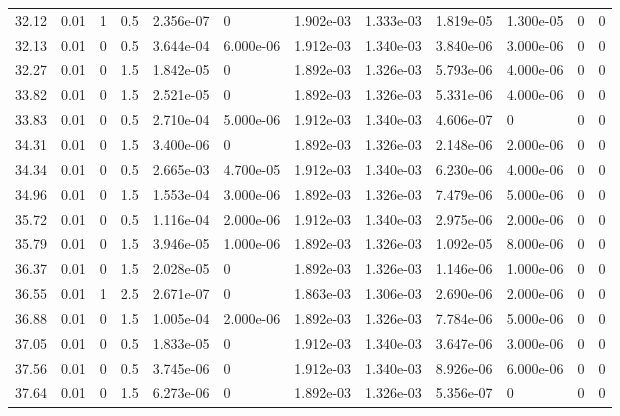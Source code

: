 \documentclass[preview]{standalone}
\begin{document}
{{{\begin{tabular}{L{1.2cm}C{1.2cm} C{0.3cm}C{0.5cm} C{1.4cm}C{1.4cm} C{1.4cm}C{1.4cm} C{1.6cm}C{1.6cm} C{1.6cm}C{1.6cm}}
  32.12  &  0.01  & 1     & 0.5 &  2.356e-07  & 0  &  1.902e-03&   1.333e-03& 1.819e-05 & 1.300e-05   &  0 & 0  \\ 
  32.13  &  0.01  & 0     & 0.5 &  3.644e-04  & 6.000e-06  &  1.912e-03&   1.340e-03& 3.840e-06 & 3.000e-06   &  0 & 0  \\ 
  32.27  &  0.01  & 0     & 1.5 &  1.842e-05  & 0  &  1.892e-03&   1.326e-03& 5.793e-06 & 4.000e-06   &  0 & 0  \\ 
  33.82  &  0.01  & 0     & 1.5 &  2.521e-05  & 0  &  1.892e-03&   1.326e-03& 5.331e-06 & 4.000e-06   &  0 & 0  \\ 
  33.83  &  0.01  & 0     & 0.5 &  2.710e-04  & 5.000e-06  &  1.912e-03&   1.340e-03& 4.606e-07 & 0   &  0 & 0  \\ 
  34.31  &  0.01  & 0     & 1.5 &  3.400e-06  & 0  &  1.892e-03&   1.326e-03& 2.148e-06 & 2.000e-06   &  0 & 0  \\ 
  34.34  &  0.01  & 0     & 0.5 &  2.665e-03  & 4.700e-05  &  1.912e-03&   1.340e-03& 6.230e-06 & 4.000e-06   &  0 & 0  \\ 
  34.96  &  0.01  & 0     & 1.5 &  1.553e-04  & 3.000e-06  &  1.892e-03&   1.326e-03& 7.479e-06 & 5.000e-06   &  0 & 0  \\ 
  35.72  &  0.01  & 0     & 0.5 &  1.116e-04  & 2.000e-06  &  1.912e-03&   1.340e-03& 2.975e-06 & 2.000e-06   &  0 & 0  \\ 
  35.79  &  0.01  & 0     & 1.5 &  3.946e-05  & 1.000e-06  &  1.892e-03&   1.326e-03& 1.092e-05 & 8.000e-06   &  0 & 0  \\ 
  36.37  &  0.01  & 0     & 1.5 &  2.028e-05  & 0  &  1.892e-03&   1.326e-03& 1.146e-06 & 1.000e-06   &  0 & 0  \\ 
  36.55  &  0.01  & 1     & 2.5 &  2.671e-07  & 0  &  1.863e-03&   1.306e-03& 2.690e-06 & 2.000e-06   &  0 & 0  \\ 
  36.88  &  0.01  & 0     & 1.5 &  1.005e-04  & 2.000e-06  &  1.892e-03&   1.326e-03& 7.784e-06 & 5.000e-06   &  0 & 0  \\ 
  37.05  &  0.01  & 0     & 0.5 &  1.833e-05  & 0  &  1.912e-03&   1.340e-03& 3.647e-06 & 3.000e-06   &  0 & 0  \\ 
  37.56  &  0.01  & 0     & 0.5 &  3.745e-06  & 0  &  1.912e-03&   1.340e-03& 8.926e-06 & 6.000e-06   &  0 & 0  \\ 
  37.64  &  0.01  & 0     & 1.5 &  6.273e-06  & 0  &  1.892e-03&   1.326e-03& 5.356e-07 & 0   &  0 & 0  \\ 
\hline 
\end{tabular} 

}}}
\end{document}

